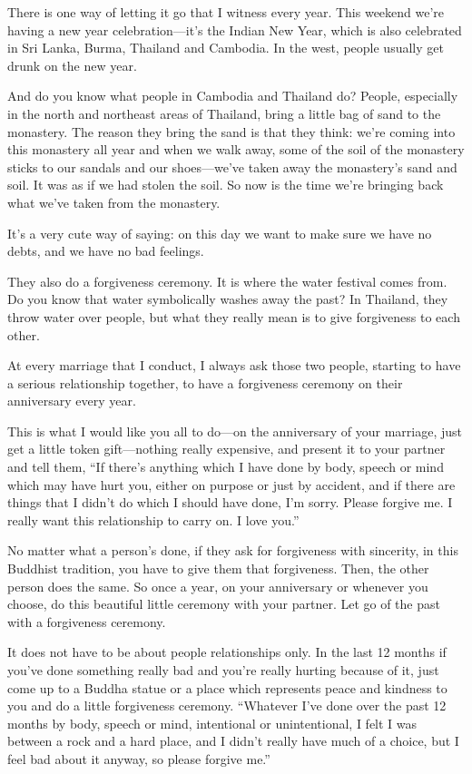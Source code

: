 \documentclass[12pt, openany]{book}
\begin{document}
There is one way of letting it go that I witness every year. This weekend we’re having a new year celebration—it’s the Indian New Year, which is also celebrated in Sri Lanka, Burma, Thailand and Cambodia. In the west, people usually get drunk on the new year. 

And do you know what people in Cambodia and Thailand do? People, especially in the north and northeast areas of Thailand, bring a little bag of sand to the monastery. The reason they bring the sand is that they think: we’re coming into this monastery all year and when we walk away, some of the soil of the monastery sticks to our sandals and our shoes—we’ve taken away the monastery’s sand and soil. It was as if we had stolen the soil. So now is the time we’re bringing back what we’ve taken from the monastery. 

It’s a very cute way of saying: on this day we want to make sure we have no debts, and we have no bad feelings. 

They also do a forgiveness ceremony. It is where the water festival comes from. Do you know that water symbolically washes away the past? In Thailand, they throw water over people, but what they really mean is to give forgiveness to each other. 

At every marriage that I conduct, I always ask those two people, starting to have a serious relationship together, to have a forgiveness ceremony on their anniversary every year. 

This is what I would like you all to do—on the anniversary of your marriage, just get a little token gift—nothing really expensive, and present it to your partner and tell them, “If there’s anything which I have done by body, speech or mind which may have hurt you, either on purpose or just by accident, and if there are things that I didn’t do which I should have done, I’m sorry. Please forgive me. I really want this relationship to carry on. I love you.” 

No matter what a person’s done, if they ask for forgiveness with sincerity, in this Buddhist tradition, you have to give them that forgiveness. Then, the other person does the same. So once a year, on your anniversary or whenever you choose, do this beautiful little ceremony with your partner. Let go of the past with a forgiveness ceremony. 

It does not have to be about people relationships only. In the last 12 months if you’ve done something really bad and you’re really hurting because of it, just come up to a Buddha statue or a place which represents peace and kindness to you and do a little forgiveness ceremony. “Whatever I’ve done over the past 12 months by body, speech or mind, intentional or unintentional, I felt I was between a rock and a hard place, and I didn’t really have much of a choice, but I feel bad about it anyway, so please forgive me.” 
\end{document}
